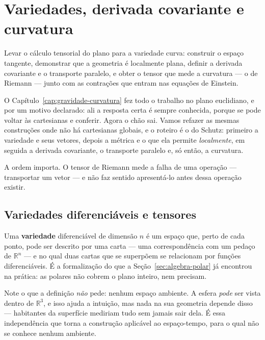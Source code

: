 \documentclass[12pt,a4paper,oneside]{book}
\theoremstyle{rgplain}
\theoremstyle{rgremark}
\begin{document}
\chapter[Derivada covariante e curvatura]{Variedades, derivada covariante e
curvatura}
\label{cap:curvatura}

\begin{objetivos}
Levar o cálculo tensorial do plano para a variedade curva: construir o espaço
tangente, demonstrar que a geometria é localmente plana, definir a derivada
covariante e o transporte paralelo, e obter o tensor que mede a curvatura ---
o de Riemann --- junto com as contrações que entram nas equações de Einstein.
\end{objetivos}

O Capítulo~\ref{cap:gravidade-curvatura} fez todo o trabalho no plano
euclidiano, e por um motivo declarado: ali a resposta certa é sempre
conhecida, porque se pode voltar às cartesianas e conferir. Agora o chão sai.
Vamos refazer as mesmas construções onde não há cartesianas globais, e o
roteiro é o do Schutz: primeiro a variedade e seus vetores, depois a métrica e
o que ela permite \emph{localmente}, em seguida a derivada covariante, o
transporte paralelo e, só então, a curvatura.

A ordem importa. O tensor de Riemann mede a falha de uma operação ---
transportar um vetor --- e não faz sentido apresentá-lo antes dessa operação
existir.

\section{Variedades diferenciáveis e tensores}
\label{sec:variedades}

Uma \textbf{variedade} diferenciável de dimensão $n$ é um espaço que, perto de
cada ponto, pode ser descrito por uma carta --- uma correspondência com um
pedaço de $\mathbb{R}^n$ --- e no qual duas cartas que se superpõem se
relacionam por funções diferenciáveis. É a formalização do que a
Seção~\ref{sec:algebra-polar} já encontrou na prática: as polares não cobrem o
plano inteiro, nem precisam.

\begin{atencao}
Note o que a definição \emph{não} pede: nenhum espaço ambiente. A esfera
\emph{pode} ser vista dentro de $\mathbb{R}^3$, e isso ajuda a intuição, mas
nada na sua geometria depende disso --- habitantes da superfície mediriam tudo
sem jamais sair dela. É essa independência que torna a construção aplicável ao
espaço-tempo, para o qual não se conhece nenhum ambiente.
\end{atencao}
\end{document}
